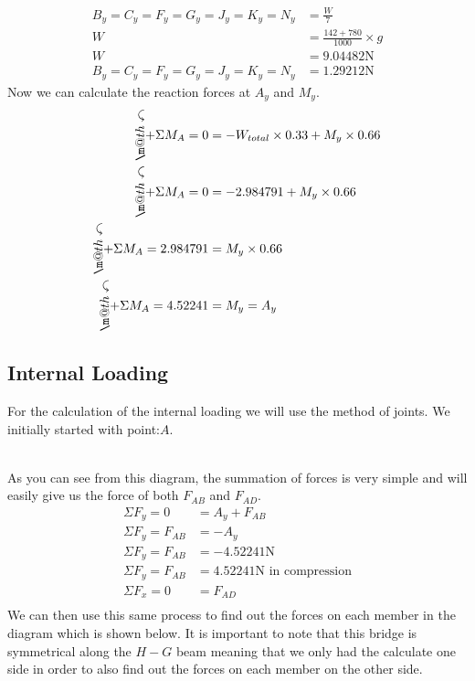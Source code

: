 \documentclass{article}
\makeatletter
\newcommand*\curveplus{%
  \mathbin{\rotatebox[origin=c]{90}{$\m@th\curvearrowleft$}+}}
\makeatother
\begin{document}
\begin{align*}
    B_y=C_y=F_y=G_y=J_y=K_y=N_y&=\frac{W}{7}\\
    W &=\frac{142+780}{1000}\times g\\
    W &=9.04482\text{N}\\
    B_y=C_y=F_y=G_y=J_y=K_y=N_y&=1.29212\text{N}
\end{align*}
Now we can calculate the reaction forces at $A_y$ and $M_y$.
\begin{align*}
    \curveplus \Sigma M_A=0&=-W_{total} \times 0.33 + M_y \times 0.66\\
    \curveplus \Sigma M_A=0&=-2.984791 + M_y \times 0.66\\
    \curveplus \Sigma M_A=2.984791&=M_y \times 0.66\\
    \curveplus \Sigma M_A=4.52241&=M_y=A_y\\
\end{align*}
\subsection{Internal Loading}
For the calculation of the internal loading we will use the method of joints. We initially started with point:$A$.\\
\\
As you can see from this diagram, the summation of forces is very simple and will easily give us the force of both $F_{AB}$ and $F_{AD}$.
\begin{align*}
    \Sigma F_{y}=0&=A_y+F_{AB}\\
    \Sigma F_{y}=F_{AB}&=-A_y\\
    \Sigma F_{y}=F_{AB}&=-4.52241\text{N}\\
    \Sigma F_{y}=F_{AB}&=4.52241\text{N in compression}\\
    \Sigma F_{x}=0&=F_{AD}\\
\end{align*}
We can then use this same process to find out the forces on each member in the diagram which is shown below. It is important to note that this bridge is symmetrical along the $H-G$ beam meaning that we only had the calculate one side in order to also find out the forces on each member on the other side.\\
\end{document}
